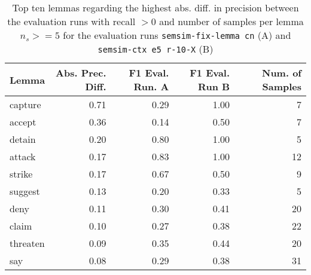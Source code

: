 \documentclass[11pt]{scrreprt}
\begin{document}
\begin{table}[ht]
\centering
\begin{tabular}{lrrrr}
\toprule
Lemma      & Abs. Prec. Diff. & F1 Eval. Run. A & F1 Eval. Run B & Num. of Samples \\
\midrule
capture    & 0.71	& 0.29	& 1.00	& 7 	\\
accept     & 0.36	& 0.14	& 0.50	& 7 	\\
detain     & 0.20	& 0.80	& 1.00	& 5 	\\
attack     & 0.17	& 0.83	& 1.00	& 12	\\
strike     & 0.17	& 0.67	& 0.50	& 9 	\\
suggest    & 0.13	& 0.20	& 0.33	& 5 	\\
deny       & 0.11	& 0.30	& 0.41	& 20 	\\
claim      & 0.10	& 0.27	& 0.38	& 22	\\
threaten   & 0.09	& 0.35	& 0.44	& 20	\\
say		   & 0.08 	& 0.29 	& 0.38  & 31\\
\bottomrule
\end{tabular}
\caption{Top ten lemmas regarding the highest abs. diff. in precision between the evaluation runs with recall \(> 0\) and number of samples per lemma \(n_s >= 5\) for the evaluation runs \texttt{semsim-fix-lemma cn} (A) and \texttt{semsim-ctx e5 r-10-X} (B)}
\end{table}
\end{document}
